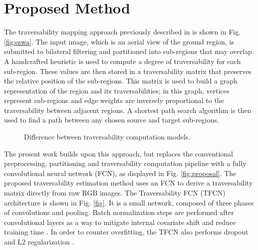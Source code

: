 \documentclass[conference]{IEEEtran}
\begin{document}
\section{Proposed Method}
\label{section:proposed-method}

The traversability mapping approach previously described in \cite{borges:2019} is shown in Fig. \ref{fig:eswa}.
The input image, which is an aerial view of the ground region, is submitted to bilateral filtering and partitioned into sub-regions that may overlap.
A handcrafted heuristic is used to compute a degree of traversability for each sub-region.
These values are then stored in a traversability matrix that preserves the relative position of the sub-regions.
This matrix is used to build a graph representation of the region and its traversabilities; in this graph, vertices represent sub-regions and edge weights are inversely proportional to the traversability between adjacent regions.
A shortest path search algorithm is then used to find a path between any chosen source and target sub-regions.

\begin{figure}[ht]
\centering


\vspace{0.25cm}


\caption{Difference between traversability computation models.}
\label{fig:flocharts}
\end{figure}

The present work builds upon this approach, but replaces the conventional preprocessing, partitioning and traversability computation pipeline with a fully convolutional neural network (FCN), as displayed in Fig. \ref{fig:proposal}.
The proposed traversability estimation method uses an FCN to derive a traversability matrix directly from raw RGB images.
The Traversability FCN (TFCN) architecture is shown in Fig. \ref{fig}.
It is a small network, composed of three phases of convolutions and pooling.
Batch normalization steps are performed after convolutional layers as a way to mitigate internal covariate shift and reduce training time \cite{ioffe:2015}.
In order to counter overfitting, the TFCN also performs dropout \cite{srivastava:2014} and L2 regularization \cite{ng:2004}.
\end{document}
